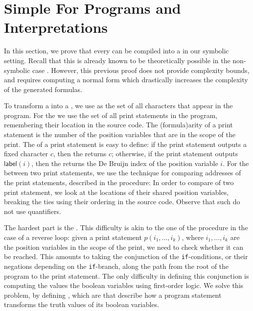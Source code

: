 \section{Simple For Programs and Interpretations}
\label{sec:low-level}

In this section, we prove that every  can be compiled
into a  in our symbolic setting. Recall that
this is already known to be theoretically possible in the non-symbolic case
\cite{bojanczyk2018polyregular}. However, this previous proof does not provide
complexity bounds, and requires computing a normal form
 which drastically increases the complexity of the
generated formulas.

To transform a  into a ,
we use as  the set of all
characters that appear in the program. For the  we use the set of all print statements in the program, remembering their
location in the source code. The \kl(formula){arity} of a print statement
is the number of the position variables that are in the scope of the print.
The  of a print statement is easy to define: if
the print statement outputs a fixed character $c$, then the  returns $c$; otherwise,
if the print statement outputs $\mathsf{label}(i)$,
then the  returns the De Bruijn index \cite{DEBRUJ72}
of the position variable $i$. For the  between two print statements,
we use the technique for comparing addresses of the print statements, 
described in the  procedure:
In order to compare of two print statement, we look 
at the locations of their shared position variables,
breaking the ties using their ordering in the source code.
Observe that such  do not use quantifiers.

The hardest part is the . This difficulty is akin to the one of the
 procedure in the case of a reverse loop: given a print
statement $p(i_1, \dots, i_k)$, where $i_1, \dots, i_k$ are the position
variables in the scope of the print, we need to check whether it can
be reached. This amounts to taking the conjunction of the \texttt{if}-conditions, 
or their negations depending on the \texttt{if}-branch, along the path
from the root of the program to the print statement.
The only difficulty in defining this conjunction is
computing the values the boolean variables using 
first-order logic. We solve this problem, by defining
, which are  
that describe how a program statement transforms
the truth values of its boolean variables.


